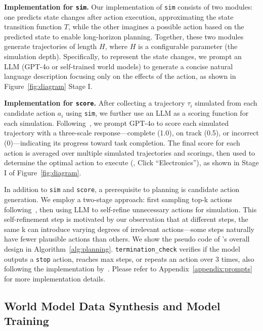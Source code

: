 \textbf{Implementation for \texttt{sim}.}
Our implementation of \texttt{sim} consists of two modules: one predicts state changes after action execution, approximating the state transition function $T$, while the other imagines a possible action based on the predicted state to enable long-horizon planning.
Together, these two modules generate trajectories of length $H$, where $H$ is a configurable parameter (the simulation depth).
Specifically, to represent the state changes, we prompt an LLM (GPT-4o or self-trained world models) to generate a concise natural language description focusing only on the effects of the action, as shown in Figure~\ref{fig:diagram} Stage I.

\textbf{Implementation for \texttt{score}.}
After collecting a trajectory $\tau_i$ simulated from each candidate action $a_i$ using \texttt{sim}, we further use an LLM as a scoring function for each simulation.
Following~\cite{koh2024tree}, we prompt GPT-4o to score each simulated trajectory with a three-scale response---complete (1.0), on track (0.5), or incorrect (0)---indicating its progress toward task completion. 
The final score for each action is averaged over multiple simulated trajectories and scorings, then used to determine the optimal action to execute (\eg, Click ``Electronics''), as shown in Stage I of Figure~\ref{fig:diagram}.


In addition to \texttt{sim} and \texttt{score}, a prerequisite to planning is candidate action generation.
We employ a two-stage approach: first sampling top-k actions following~\cite{koh2024tree}, then using LLM to self-refine unnecessary actions for simulation. 
This self-refinement step is motivated by our observation that at different steps, the same k can introduce varying degrees of irrelevant actions---some steps naturally have fewer plausible actions than others.
We show the pseudo code of \OurMethod's overall design in Algorithm~\ref{alg:planning}.
\texttt{termination\_check} verifies if the model outputs a \texttt{stop} action, reaches max steps, or repeats an action over 3 times, also following the implementation by~\cite{koh2024tree}. Please refer to Appendix~\ref{appendix:prompts} for more implementation details.




\subsection{World Model Data Synthesis and Model Training}
\label{subsec:train-world-model}


